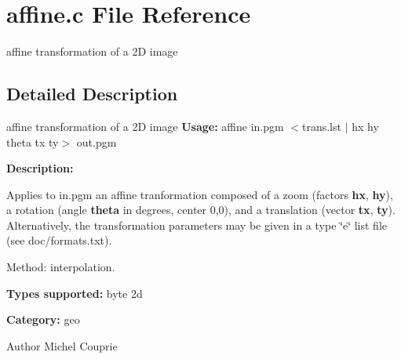 \section{affine.c File Reference}
\label{affine_8c}


affine transformation of a 2D image  




\subsection{Detailed Description}
affine transformation of a 2D image {\bfseries Usage:} affine in.pgm $<$trans.lst $|$ hx hy theta tx ty$>$ out.pgm

{\bfseries Description:}

Applies to in.pgm an affine tranformation composed of a zoom (factors {\bfseries hx}, {\bfseries hy}), a rotation (angle {\bfseries theta} in degrees, center 0,0), and a translation (vector {\bfseries tx}, {\bfseries ty}). Alternatively, the transformation parameters may be given in a type \char`\"{}e\char`\"{} list file (see doc/formats.txt).

Method: interpolation.

{\bfseries Types supported:} byte 2d

{\bfseries Category:} geo

\begin{DoxyAuthor}{Author}
Michel Couprie 
\end{DoxyAuthor}
